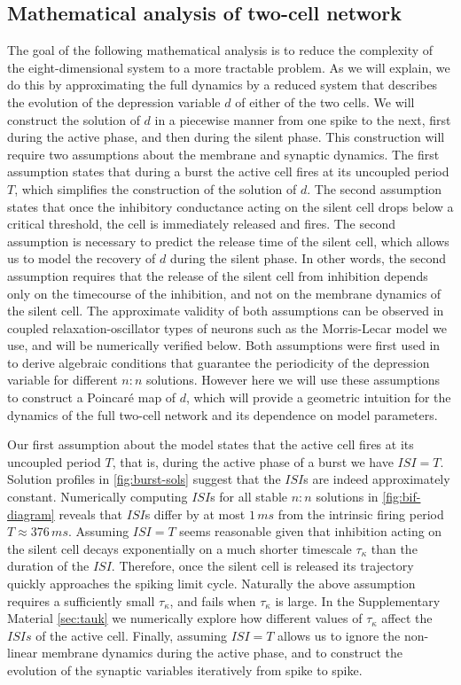 \documentclass[utf8]{frontiersFPHY} %
\begin{document}
\subsection{Mathematical analysis of two-cell network}
\label{sec:assumptions}
The goal of the following mathematical analysis is to reduce the complexity of the
eight-dimensional system to a more tractable problem.
As we will explain, we do this by approximating the full dynamics by a reduced system that describes the evolution of the depression variable $d$ of either of the two cells.
We will construct the solution of $d$ in a piecewise manner from one spike to the next, first during the active phase, and then during the silent phase.
This construction will require two assumptions about the membrane and synaptic dynamics.
The first assumption states that during a burst the active cell fires at its uncoupled period $T$, which simplifies the construction of the solution of $d$.
The second assumption states that once the inhibitory conductance acting on the silent cell drops below a critical threshold, the cell is immediately released and fires.
The second assumption is necessary to predict the release time of the silent cell, which allows us to model the recovery of $d$ during the silent phase.
In other words, the second assumption requires that the release of the silent cell from inhibition depends only on the timecourse of the inhibition, and not on the membrane dynamics of the silent cell.
The approximate validity of both assumptions can be observed in coupled relaxation-oscillator types of neurons such as the Morris-Lecar model we use, and will be numerically verified below.
Both assumptions were first used in~\cite{bose2011} to derive algebraic conditions that guarantee the periodicity of the depression variable for different $n:n$ solutions.
However here we will use these assumptions to construct a Poincaré map of $d$, which will provide a geometric intuition for the dynamics of the full two-cell network and its dependence on model parameters.

Our first assumption about the model states that the active cell fires at its uncoupled period $T$, that is, during the active phase of a burst we have $ISI=T$.
Solution profiles in \cref{fig:burst-sols} suggest that the $ISI$s are indeed approximately constant.
Numerically computing $ISI$s for all stable $n:n$ solutions in \cref{fig:bif-diagram} reveals that $ISI$s differ by at most $1\, \si{ms}$ from the intrinsic firing period $T\approx 376\, \si{ms}$.
Assuming $ISI=T$ seems reasonable given that inhibition acting on the silent cell decays exponentially on a much shorter timescale $\tau_{\kappa}$ than the duration of the $ISI$. Therefore, once the silent cell is released its trajectory quickly approaches the spiking limit cycle.
Naturally the above assumption requires a sufficiently small $\tau_{\kappa}$, and fails when $\tau_{\kappa}$ is large.
In the Supplementary Material \cref{sec:tauk} we numerically explore how different values of $\tau_{\kappa}$ affect the $ISIs$ of the active cell.
Finally, assuming $ISI=T$ allows us to ignore the non-linear membrane dynamics during the active phase, and to construct the evolution of the synaptic variables iteratively from spike to spike.
\end{document}
